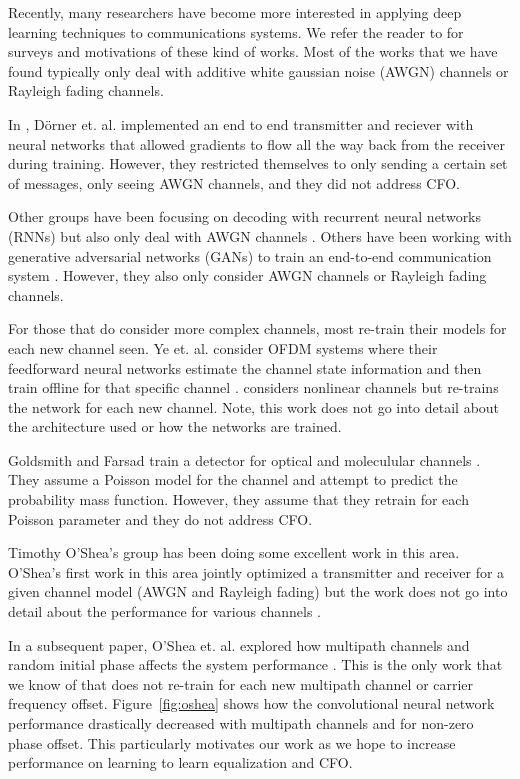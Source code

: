 Recently, many researchers have become more interested in applying deep learning techniques to communications systems.  
We refer the reader to \cite{botoca}\cite{diamandis}\cite{wang}\cite{hemodel}\cite{osheaphys} for surveys and motivations of these kind of works.  
Most of the works that we have found typically only deal with additive white gaussian noise (AWGN) channels or Rayleigh fading channels.

In \cite{dorner2017}, D\"{o}rner et. al. implemented an end to end transmitter and reciever with neural networks that allowed gradients to flow all the way back from the receiver during training.  
However, they restricted themselves to only sending a certain set of messages, only seeing AWGN channels, and they did not address CFO. 

Other groups have been focusing on decoding with recurrent neural networks (RNNs) but also only deal with AWGN channels \cite{kim2018}\cite{kimnips}.  
Others have been working with generative adversarial networks (GANs) to train an end-to-end communication system \cite{yegans}.  However, they also only consider AWGN channels or Rayleigh fading channels.

For those that do consider more complex channels, most re-train their models for each new channel seen.  Ye et. al. consider OFDM systems where their feedforward neural networks estimate the channel state information and then train offline for that specific channel \cite{ye2018}.  
\cite{raghavendra} considers nonlinear channels but re-trains the network for each new channel.  Note, this work does not go into detail about the architecture used or how the networks are trained. 

Goldsmith and Farsad train a detector for optical and moleculular channels \cite{farsad2018}.  They assume a Poisson model for the channel and attempt to predict the probability mass function.  However, they assume that they retrain for each Poisson parameter and they do not address CFO.

Timothy O'Shea's group has been doing some excellent work in this area. 
O'Shea's first work in this area jointly optimized a transmitter and receiver for a given channel model (AWGN and Rayleigh fading) but the work does not go into detail about the performance for various channels \cite{osheaphys}.

In a subsequent paper, O'Shea et. al. explored how multipath channels and random initial phase affects the system performance \cite{osheaatt}.  
This is the only work that we know of that does not re-train for each new multipath channel or carrier frequency offset. 
Figure~\ref{fig:oshea} shows how the convolutional neural network performance drastically decreased with multipath channels and for non-zero phase offset.
This particularly motivates our work as we hope to increase performance on learning to learn equalization and CFO.

